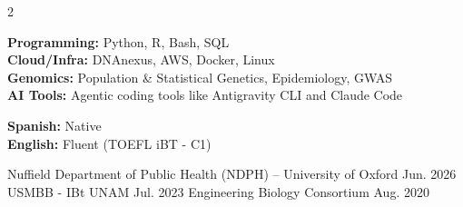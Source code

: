 \documentclass[10pt]{simplecv}
\begin{document}
\vspace{0.3cm}
\begin{multicols}{2}
  
    {\footnotesize
        \textbf{Programming:} Python, R, Bash, SQL \\
        \textbf{Cloud/Infra:} DNAnexus, AWS, Docker, Linux \\
        \textbf{Genomics:} Population \& Statistical Genetics, Epidemiology, GWAS \\
        \textbf{AI Tools:} Agentic coding tools like Antigravity CLI and Claude Code \\
    }

    {\footnotesize
        \textbf{Spanish:} Native \\
        \textbf{English:} Fluent (TOEFL iBT - C1)
    }

\vfill\null\columnbreak

    {Nuffield Department of Public Health (NDPH) -- University of Oxford}
    {}
    {}{Jun. 2026}
    {}
    {USMBB - IBt UNAM}
    {}
    {}{Jul. 2023}
    {}
    {Engineering Biology Consortium}
    {}
    {}{Aug. 2020}
    {}

\end{multicols}
\end{document}

